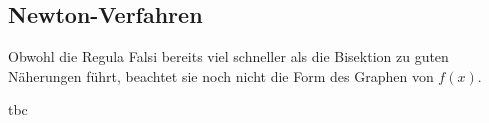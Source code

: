 \clearpage
\subsection{Newton-Verfahren}
Obwohl die Regula Falsi bereits viel schneller als die Bisektion zu guten Näherungen führt, beachtet sie noch nicht die Form des Graphen von $f(x)$.

tbc
